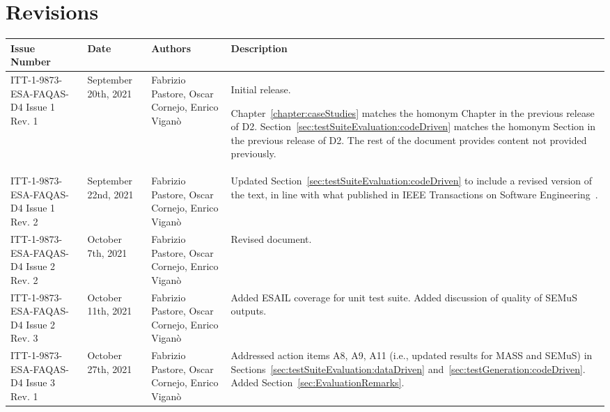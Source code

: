 
\section*{Revisions}
\label{sec:revisions}


\setlength\LTleft{0pt}
\setlength\LTright{0pt}
\tiny 
\begin{longtable}{|p{2cm}|p{1cm}|p{1.5cm}|p{9cm}|@{}}
\label{table:codeoperators} \\
\hline
\textbf{Issue Number}&\textbf{Date}&\textbf{Authors}&\textbf{Description}\\
\hline
ITT-1-9873-ESA-FAQAS-D4
Issue 1 Rev. 1&
September 20th, 2021&
Fabrizio Pastore, Oscar Cornejo, Enrico Viganò&
\begin{minipage}{8cm}
Initial release.

Chapter~\ref{chapter:caseStudies} matches the homonym Chapter in the previous release of D2.
Section~\ref{sec:testSuiteEvaluation:codeDriven} matches the homonym Section in the previous release of D2.
The rest of the document provides content not provided previously.
\end{minipage}
\\
\hline
ITT-1-9873-ESA-FAQAS-D4
Issue 1 Rev. 2&
September 22nd, 2021&
Fabrizio Pastore, Oscar Cornejo, Enrico Viganò&
\begin{minipage}{8cm}
Updated Section~\ref{sec:testSuiteEvaluation:codeDriven} to include a revised version of the text, in line with what published in IEEE Transactions on Software Engineering~\cite{Oscar:TSE}.
\end{minipage}
\\
\hline
ITT-1-9873-ESA-FAQAS-D4
Issue 2 Rev. 2&
October 7th, 2021&
Fabrizio Pastore, Oscar Cornejo, Enrico Viganò&
\begin{minipage}{8cm}
Revised document.
\end{minipage}
\\
\hline

ITT-1-9873-ESA-FAQAS-D4
Issue 2 Rev. 3&
October 11th, 2021&
Fabrizio Pastore, Oscar Cornejo, Enrico Viganò&
\begin{minipage}{8cm}
Added ESAIL coverage for unit test suite. Added discussion of quality of SEMuS outputs.
\end{minipage}
\\
\hline

ITT-1-9873-ESA-FAQAS-D4
Issue 3 Rev. 1&
October 27th, 2021&
Fabrizio Pastore, Oscar Cornejo, Enrico Viganò&
\begin{minipage}{8cm}
Addressed action items A8, A9, A11 (i.e., updated results for MASS and SEMuS) in Sections~\ref{sec:testSuiteEvaluation:dataDriven} and~\ref{sec:testGeneration:codeDriven}.
Added Section~\ref{sec:EvaluationRemarks}.
\end{minipage}
\\
\hline
                                                    
\end{longtable}
\normalsize

\clearpage